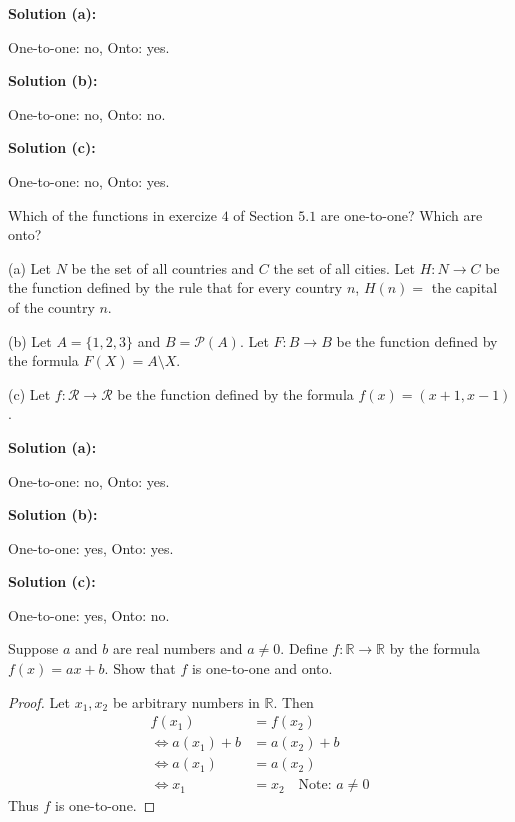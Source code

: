 \textbf{Solution (a):}
\begin{center}
    One-to-one: no, Onto: yes.
\end{center}
\textbf{Solution (b):}
\begin{center}
    One-to-one: no, Onto: no.
\end{center}
\textbf{Solution (c):}
\begin{center}
    One-to-one: no, Onto: yes.
\end{center}

\begin{tcolorbox}[title=Problem 4, breakable]
    Which of the functions in exercize $4$ of Section $5.1$
        are one-to-one? Which are onto?

    (a) Let $N$ be the set of all countries and $C$ the set of all 
        cities. Let $H : N \rightarrow C$ be the function defined by the rule 
        that for every country $n$, $H(n) =$ the capital of the country $n$.

    (b) Let $A = \{1, 2, 3\}$ and $B = \mathcal{P}(A)$.
        Let $F : B \rightarrow B$ be the function defined by the 
            formula $F(X) = A \setminus X$.

    (c) Let $f : \mathcal{R} \rightarrow \mathcal{R}$ be the function 
        defined by the formula $f(x) = (x + 1, x - 1)$.
\end{tcolorbox}

\textbf{Solution (a):}
\begin{center}
    One-to-one: no, Onto: yes.
\end{center}
\textbf{Solution (b):}
\begin{center}
    One-to-one: yes, Onto: yes.
\end{center}
\textbf{Solution (c):}
\begin{center}
    One-to-one: yes, Onto: no.
\end{center}

\newpage
\begin{tcolorbox}[title=Problem 6, breakable]
    Suppose $a$ and $b$ are real numbers and $a \ne 0$. 
    Define $f : \mathbb{R} \rightarrow \mathbb{R}$ by the 
        formula $f(x) = ax + b$.
    Show that $f$ is one-to-one and onto.
\end{tcolorbox}

\begin{proof}
    Let $x_1, x_2$ be arbitrary numbers in $\mathbb{R}$.
    Then 
    \begin{align*}
        f(x_1) &= f(x_2) \\
        \iff a(x_1) + b &= a(x_2) + b \\
        \iff a(x_1) &= a(x_2) \\
        \iff x_1 &= x_2 \quad \text{Note: $a \ne 0$}
    \end{align*}
    Thus $f$ is one-to-one.
\end{proof}

